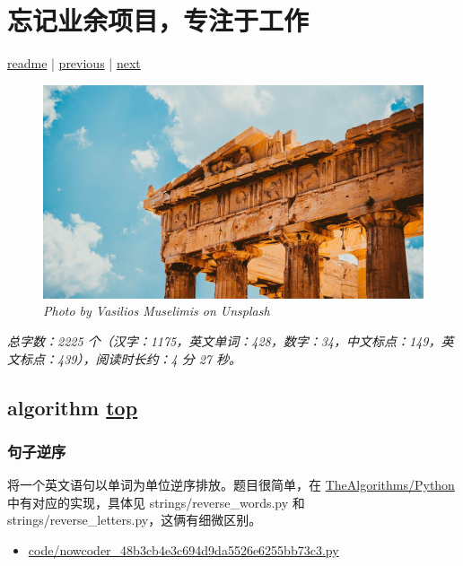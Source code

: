 \chapter{忘记业余项目，专注于工作}\label{chap:w2}

\noindent \href{https://github.com/taseikyo/arts}{readme} | \hyperref[chap:w1]{previous} | \hyperref[chap:w3]{next}

\begin{figure}[htbp]
  \centering
    \includegraphics[width=\textwidth]{../images/2020/11/vasilios-muselimis-BirCcqcSX5U-unsplash.jpg}
  \caption{\textit{Photo by Vasilios Muselimis on Unsplash}}
\end{figure}

\textit{总字数：2225 个（汉字：1175，英文单词：428，数字：34，中文标点：149，英文标点：439），阅读时长约：4 分 27 秒。}

\section{algorithm \hyperref[chap:w2]{top}}\label{w2:algorithm}

\subsection{句子逆序}

将一个英文语句以单词为单位逆序排放。题目很简单，在 \href{https://github.com/TheAlgorithms/Python}{TheAlgorithms/Python} 中有对应的实现，具体见 strings/reverse\_words.py 和 strings/reverse\_letters.py，这俩有细微区别。

\begin{itemize}
  \item \href{https://github.com/taseikyo/arts/blob/master/code/nowcoder_48b3cb4e3c694d9da5526e6255bb73c3.py}{code/nowcoder\_48b3cb4e3c694d9da5526e6255bb73c3.py}
\end{itemize}

